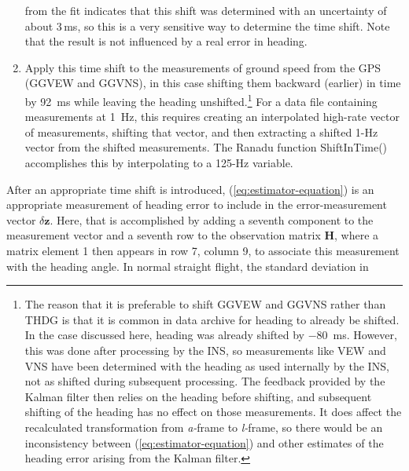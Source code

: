 \documentclass[12pt,twoside,english,12pt,twoside,english]{article}\usepackage[]{graphicx}\usepackage[]{color}
\let\OrgIndex\index
\renewcommand*{\index}[1]{\OrgIndex{#1}}
\begin{document}
\begin{enumerate}
from the fit indicates that this shift was determined with an uncertainty
of about 3\,ms, so this is a very sensitive way to determine the
time shift. Note that the result is not influenced by a real error
in heading.
\item Apply this time shift to the measurements
of ground speed from the GPS (GGVEW
and GGVNS), in this
case shifting them backward (earlier) in time by 92~ms while leaving
the heading unshifted.\footnote{The reason that it is preferable to shift GGVEW and GGVNS rather than
THDG is that it is common in data archive for heading to already be
shifted. In the case discussed here, heading was already shifted by
$-80$~ms. However, this was done after processing by the INS, so
measurements like VEW and VNS have been
determined with the heading as used internally by the INS, not as
shifted during subsequent processing. The feedback provided by the
Kalman filter then relies on the heading before shifting, and subsequent
shifting of the heading has no effect on those measurements. It does
affect the recalculated transformation from \emph{a-}frame
to \emph{l-}frame,
so there would be an inconsistency between (\ref{eq:estimator-equation})
and other estimates of the heading error arising from the Kalman filter.} For a data file containing measurements
at 1~Hz, this requires creating an interpolated
high-rate vector of measurements, shifting that vector, and then extracting
a shifted 1-Hz vector from the shifted measurements. The Ranadu function
ShiftInTime() accomplishes this by interpolating to a 125-Hz variable.
\end{enumerate}
After an appropriate time shift is introduced, (\ref{eq:estimator-equation})
is an appropriate measurement of heading
error to include in the error-measurement
vector $\delta\mathbf{z}$. Here, that is accomplished by adding a
seventh component to the measurement vector and a seventh row to the
observation matrix $\mathbf{H}$,
where a matrix element 1 then appears in row 7, column 9, to associate
this measurement with the heading angle.  In normal straight flight,
the standard deviation in
\end{document}
